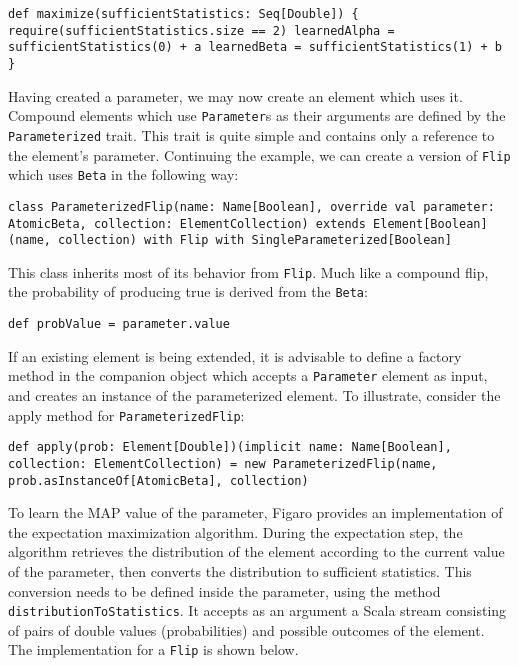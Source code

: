 \begin{flushleft}
\texttt{def maximize(sufficientStatistics: Seq[Double]) \{
\newline \tab require(sufficientStatistics.size == 2)
\newline \tab learnedAlpha = sufficientStatistics(0) + a
\newline \tab learnedBeta = sufficientStatistics(1) + b
\newline \}
}
\end{flushleft}

Having created a parameter, we may now create an element which uses it. Compound elements which use \texttt{Parameter}s as their arguments are defined by the \texttt{Parameterized} trait. This trait is quite simple and contains only a reference to the element's parameter. Continuing the example, we can create a version of \texttt{Flip} which uses \texttt{Beta} in the following way:

\begin{flushleft}
\texttt{class ParameterizedFlip(name: Name[Boolean], override val parameter: AtomicBeta, collection: ElementCollection)
\newline extends Element[Boolean](name, collection) with Flip 
\newline with SingleParameterized[Boolean]
}
\end{flushleft}

This class inherits most of its behavior from \texttt{Flip}. Much like a compound flip, the probability of producing true is derived from the \texttt{Beta}:

\begin{flushleft}
\texttt{def probValue = parameter.value}
\end{flushleft}

If an existing element is being extended, it is advisable to define a factory method in the companion object which accepts a \texttt{Parameter} element as input, and creates an instance of the parameterized element. To illustrate, consider the apply method for \texttt{ParameterizedFlip}:

\begin{flushleft}
\texttt{def apply(prob: Element[Double])(implicit name: Name[Boolean], collection: ElementCollection) =
\newline \tab new ParameterizedFlip(name, prob.asInstanceOf[AtomicBeta], collection)
}
\end{flushleft}

To learn the MAP value of the parameter, Figaro provides an implementation of the expectation maximization algorithm. During the expectation step, the algorithm retrieves the distribution of the element according to the current value of the parameter, then converts the distribution to sufficient statistics. This conversion needs to be defined inside the parameter, using the method \texttt{distributionToStatistics}. It accepts as an argument a Scala stream consisting of pairs of double values (probabilities) and possible outcomes of the element. The implementation for a \texttt{Flip} is shown below.

